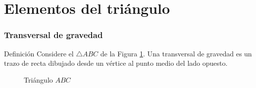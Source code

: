 \message{ !name(modelos-analiticos.tex)}\documentclass[12pt,spanish,x11names]{beamer}
\title{\talktitle}
\subtitle{\talksubtitle}
\author{\talkauthor}
\institute{\talkaffiliation}
\date{\footnotesize{\emph{\href{\talkblog}{\talkemail}}}}
\begin{document}

\begin{frame}
\titlepage
\end{frame}
\section{Elementos del triángulo}
\begin{frame}
  \frametitle{Transversal de gravedad}
  \begin{block}{Definición}
    Considere el $\triangle ABC$ de la Figura \ref{fig:tg}. Una transversal de gravedad es un trazo de
    recta dibujado desde un vértice al punto medio del lado opuesto.

    \begin{figure}[h]
      \centering
      \caption{Triángulo $ABC$}
      \label{fig:tg}
    \end{figure}
  \end{block}
\end{frame}
\begin{frame}
  
\end{frame}
\end{document}
